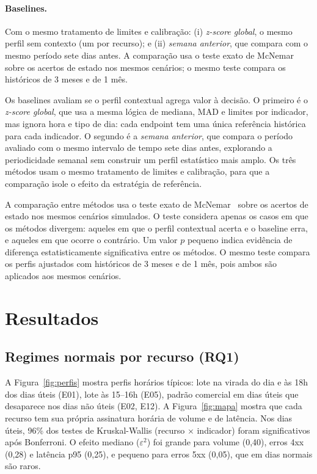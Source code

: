 \documentclass[sigconf,nonacm]{acmart}
\begin{document}
\paragraph{Baselines.} Com o mesmo tratamento de limites e calibração: (i) \emph{z-score global}, o mesmo perfil sem contexto (um por recurso); e (ii) \emph{semana anterior}, que compara com o mesmo período sete dias antes. A comparação usa o teste exato de McNemar~\citep{mcnemar1947note} sobre os acertos de estado nos mesmos cenários; o mesmo teste compara os históricos de 3 meses e de 1 mês.

Os baselines avaliam se o perfil contextual agrega valor à decisão. O primeiro é o \emph{z-score global}, que usa a mesma lógica de mediana, MAD e limites por indicador, mas ignora hora e tipo de dia: cada endpoint tem uma única referência histórica para cada indicador. O segundo é a \emph{semana anterior}, que compara o período avaliado com o mesmo intervalo de tempo sete dias antes, explorando a periodicidade semanal sem construir um perfil estatístico mais amplo. Os três métodos usam o mesmo tratamento de limites e calibração, para que a comparação isole o efeito da estratégia de referência.

A comparação entre métodos usa o teste exato de McNemar~\citep{mcnemar1947note} sobre os acertos de estado nos mesmos cenários simulados. O teste considera apenas os casos em que os métodos divergem: aqueles em que o perfil contextual acerta e o baseline erra, e aqueles em que ocorre o contrário. Um valor $p$ pequeno indica evidência de diferença estatisticamente significativa entre os métodos. O mesmo teste compara os perfis ajustados com históricos de 3 meses e de 1 mês, pois ambos são aplicados aos mesmos cenários.

\section{Resultados}\label{sec:resultados}

\subsection{Regimes normais por recurso (RQ1)}

A Figura~\ref{fig:perfis} mostra perfis horários típicos: lote na virada do dia e às 18h dos dias úteis (E01), lote às 15--16h (E05), padrão comercial em dias úteis que desaparece nos dias não úteis (E02, E12). A Figura~\ref{fig:mapa} mostra que cada recurso tem sua própria assinatura horária de volume e de latência. Nos dias úteis, 96\% dos testes de Kruskal-Wallis (recurso $\times$ indicador) foram significativos após Bonferroni. O efeito mediano ($\varepsilon^2$) foi grande para volume (0,40), erros 4xx (0,28) e latência p95 (0,25), e pequeno para erros 5xx (0,05), que em dias normais são raros.
\end{document}
